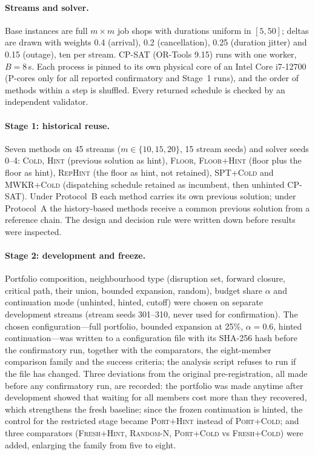 \documentclass[letterpaper]{article} %
\newcommand{\mcold}{\textsc{Cold}}
\newcommand{\mhint}{\textsc{Hint}}
\newcommand{\mfloor}{\textsc{Floor}}
\newcommand{\mfh}{\textsc{Floor+Hint}}
\newcommand{\mrho}{\textsc{RepHint}}
\newcommand{\mspt}{\textsc{SPT+Cold}}
\newcommand{\mmwkr}{\textsc{MWKR+Cold}}
\newcommand{\mfresh}{\textsc{Fresh+Cold}}
\newcommand{\mfreshh}{\textsc{Fresh+Hint}}
\newcommand{\mpc}{\textsc{Port+Cold}}
\newcommand{\mph}{\textsc{Port+Hint}}
\newcommand{\mrnd}{\textsc{Random-N}}
\begin{document}
\paragraph{Streams and solver.} Base instances are full $m{\times}m$ job shops with durations uniform in $[5,50]$; deltas are drawn with weights 0.4 (arrival), 0.2 (cancellation), 0.25 (duration jitter) and 0.15 (outage), ten per stream. CP-SAT (OR-Tools 9.15) runs with one worker, $B=8$\,s. Each process is pinned to its own physical core of an Intel Core i7-12700 (P-cores only for all reported confirmatory and Stage~1 runs), and the order of methods within a step is shuffled. Every returned schedule is checked by an independent validator.

\paragraph{Stage 1: historical reuse.} Seven methods on 45 streams ($m\in\{10,15,20\}$, 15 stream seeds) and solver seeds 0--4: \mcold, \mhint{} (previous solution as hint), \mfloor, \mfh{} (floor plus the floor as hint), \mrho{} (the floor as hint, not retained), \mspt{} and \mmwkr{} (dispatching schedule retained as incumbent, then unhinted CP-SAT). Under Protocol~B each method carries its own previous solution; under Protocol~A the history-based methods receive a common previous solution from a reference chain. The design and decision rule were written down before results were inspected.

\paragraph{Stage 2: development and freeze.} Portfolio composition, neighbourhood type (disruption set, forward closure, critical path, their union, bounded expansion, random), budget share $\alpha$ and continuation mode (unhinted, hinted, cutoff) were chosen on separate development streams (stream seeds 301--310, never used for confirmation). The chosen configuration---full portfolio, bounded expansion at 25\%, $\alpha=0.6$, hinted continuation---was written to a configuration file with its SHA-256 hash before the confirmatory run, together with the comparators, the eight-member comparison family and the success criteria; the analysis script refuses to run if the file has changed. Three deviations from the original pre-registration, all made before any confirmatory run, are recorded: the portfolio was made anytime after development showed that waiting for all members cost more than they recovered, which strengthens the fresh baseline; since the frozen continuation is hinted, the control for the restricted stage became \mph{} instead of \mpc; and three comparators (\mfreshh, \mrnd, \mpc{} vs \mfresh) were added, enlarging the family from five to eight.
\end{document}
